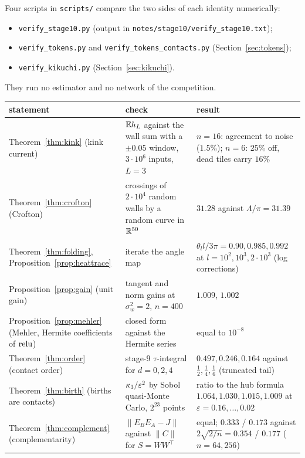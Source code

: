 \label{sec:verify}
Four scripts in \texttt{scripts/} compare the two sides of each identity numerically:
\begin{itemize}[nosep]
\item \texttt{verify\_stage10.py} (output in \texttt{notes/stage10/verify\_stage10.txt});
\item \texttt{verify\_tokens.py} and \texttt{verify\_tokens\_contacts.py} (Section~\ref{sec:tokens});
\item \texttt{verify\_kikuchi.py} (Section~\ref{sec:kikuchi}).
\end{itemize}
They run no estimator and no network of the competition.
\begin{center}\small
\begin{tabular}{>{\raggedright\arraybackslash}p{4.4cm}>{\raggedright\arraybackslash}p{6.0cm}>{\raggedright\arraybackslash}p{4.4cm}}\toprule
statement & check & result\\\midrule
Theorem~\ref{thm:kink} (kink current) & $\mathbb E h_L$ against the wall sum with a $\pm0.05$ window, $3\cdot10^6$ inputs, $L=3$ & $n=16$: agreement to noise ($1.5\%$); $n=6$: $25\%$ off, dead tiles carry $16\%$ \\
Theorem~\ref{thm:crofton} (Crofton) & crossings of $2\cdot10^4$ random walls by a random curve in $\mathbb R^{50}$ & $31.28$ against $\Lambda/\pi=31.39$\\
Theorem~\ref{thm:folding}, Proposition~\ref{prop:heattrace} & iterate the angle map & $\theta_l l/3\pi=0.90,0.985,0.992$ at $l=10^2,10^3,2\cdot10^3$ (log corrections)\\
Proposition~\ref{prop:gain} (unit gain) & tangent and norm gains at $\sigma_w^2=2$, $n=400$ & $1.009$, $1.002$\\
Proposition~\ref{prop:mehler} (Mehler, Hermite coefficients of $\operatorname{relu}$) & closed form against the Hermite series & equal to $10^{-8}$\\
Theorem~\ref{thm:order} (contact order) & stage-9 $\tau$-integral for $d=0,2,4$ & $0.497,0.246,0.164$ against $\tfrac12,\tfrac14,\tfrac16$ (truncated tail)\\
Theorem~\ref{thm:birth} (births are contacts) & $\kappa_3/\varepsilon^2$ by Sobol quasi-Monte Carlo, $2^{23}$ points & ratio to the hub formula $1.064,1.030,1.015,1.009$ at $\varepsilon=0.16,\dots,0.02$\\
Theorem~\ref{thm:complement} (complementarity) & $\|E_BE_A-J\|$ against $\|C\|$ for $S=WW^{\top}$ & equal; $0.333$ / $0.173$ against $2\sqrt{2/n}=0.354$ / $0.177$ ($n=64,256$)\\

\end{tabular}
\end{center}
